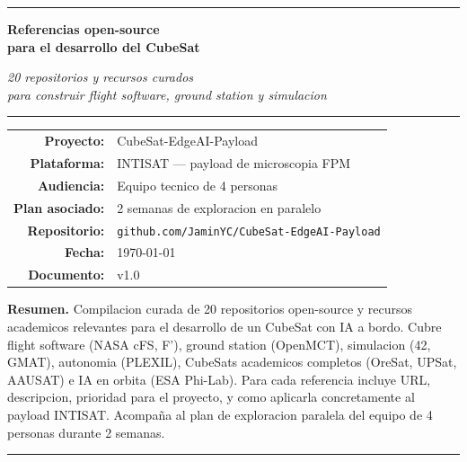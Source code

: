\documentclass[11pt,a4paper,oneside]{report}
\begin{document}
\begin{titlepage}
\centering
\vspace*{1cm}
{\color{intisat}\rule{\textwidth}{2pt}}
\vspace{0.6cm}

{\Huge\bfseries\color{intisat} Referencias open-source}\\[0.4em]
{\LARGE\bfseries para el desarrollo del CubeSat}

\vspace{0.7cm}
{\Large\itshape 20 repositorios y recursos curados\\
para construir flight software, ground station y simulacion}

\vspace{1cm}
{\color{intisataccent}\rule{0.6\textwidth}{1pt}}

\vspace{2cm}

\begin{tabular}{rl}
\textbf{Proyecto:} & CubeSat-EdgeAI-Payload \\
\textbf{Plataforma:} & INTISAT --- payload de microscopia FPM \\
\textbf{Audiencia:} & Equipo tecnico de 4 personas \\
\textbf{Plan asociado:} & 2 semanas de exploracion en paralelo \\
\textbf{Repositorio:} & \texttt{github.com/JaminYC/CubeSat-EdgeAI-Payload} \\
\textbf{Fecha:} & \today \\
\textbf{Documento:} & v1.0
\end{tabular}

\vfill

\begin{minipage}{0.85\textwidth}
\textbf{Resumen.}\quad
Compilacion curada de 20 repositorios open-source y recursos academicos
relevantes para el desarrollo de un CubeSat con IA a bordo. Cubre flight
software (NASA cFS, F'), ground station (OpenMCT), simulacion (42, GMAT),
autonomia (PLEXIL), CubeSats academicos completos (OreSat, UPSat, AAUSAT)
e IA en orbita (ESA Phi-Lab). Para cada referencia incluye URL,
descripcion, prioridad para el proyecto, y como aplicarla concretamente
al payload INTISAT. Acompaña al plan de exploracion paralela del equipo
de 4 personas durante 2 semanas.
\end{minipage}

\vspace{1.2cm}
{\color{intisat}\rule{\textwidth}{2pt}}
\end{titlepage}
\end{document}
